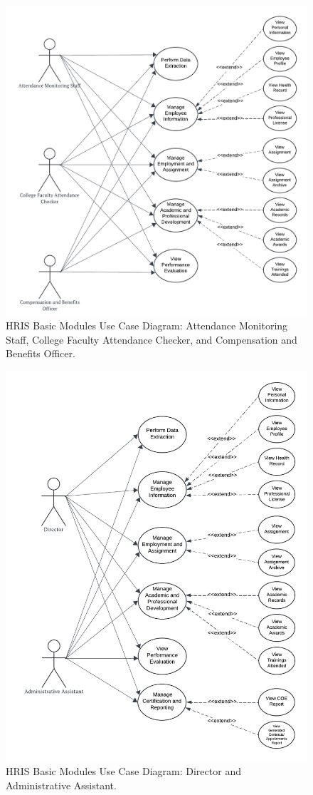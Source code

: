    \begin{figure}[H]
        \centering
        \includegraphics[width=0.9\linewidth]{figures/images/use-case-basic-2.png}
        \caption{HRIS Basic Modules Use Case Diagram: Attendance Monitoring Staff, College Faculty Attendance Checker, and Compensation and Benefits Officer.}
        \label{fig:use-case-basic-2}
    \end{figure}

    \begin{figure}[H]
        \centering
        \includegraphics[width=0.9\linewidth]{figures/images/use-case-basic-3.png}
        \caption{HRIS Basic Modules Use Case Diagram: Director and Administrative Assistant.}
        \label{fig:use-case-basic-3}
    \end{figure}

